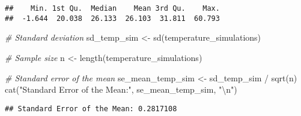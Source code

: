 \documentclass[
]{article}
\newenvironment{Shaded}{\begin{snugshade}}{\end{snugshade}}
\newcommand{\CommentTok}[1]{\textcolor[rgb]{0.56,0.35,0.01}{\textit{#1}}}
\newcommand{\FunctionTok}[1]{\textcolor[rgb]{0.00,0.00,0.00}{#1}}
\newcommand{\NormalTok}[1]{#1}
\newcommand{\OtherTok}[1]{\textcolor[rgb]{0.56,0.35,0.01}{#1}}
\newcommand{\SpecialCharTok}[1]{\textcolor[rgb]{0.00,0.00,0.00}{#1}}
\newcommand{\StringTok}[1]{\textcolor[rgb]{0.31,0.60,0.02}{#1}}
\begin{document}
\begin{verbatim}
##    Min. 1st Qu.  Median    Mean 3rd Qu.    Max. 
##  -1.644  20.038  26.133  26.103  31.811  60.793
\end{verbatim}

\begin{Shaded}
\begin{Highlighting}[]
\CommentTok{\# Standard deviation}
\NormalTok{sd\_temp\_sim }\OtherTok{\textless{}{-}} \FunctionTok{sd}\NormalTok{(temperature\_simulations)}

\CommentTok{\# Sample size}
\NormalTok{n }\OtherTok{\textless{}{-}} \FunctionTok{length}\NormalTok{(temperature\_simulations)}

\CommentTok{\# Standard error of the mean}
\NormalTok{se\_mean\_temp\_sim }\OtherTok{\textless{}{-}}\NormalTok{ sd\_temp\_sim }\SpecialCharTok{/} \FunctionTok{sqrt}\NormalTok{(n)}
\FunctionTok{cat}\NormalTok{(}\StringTok{"Standard Error of the Mean:"}\NormalTok{, se\_mean\_temp\_sim, }\StringTok{"}\SpecialCharTok{\textbackslash{}n}\StringTok{"}\NormalTok{)}
\end{Highlighting}
\end{Shaded}

\begin{verbatim}
## Standard Error of the Mean: 0.2817108
\end{verbatim}
\end{document}
